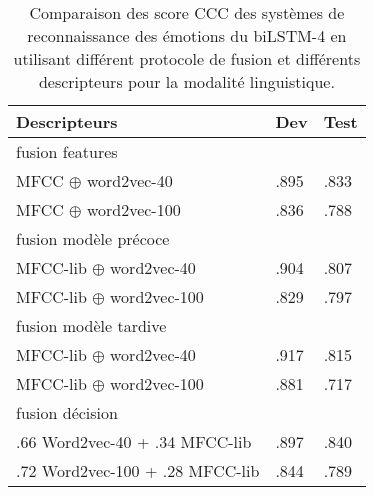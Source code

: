 \begin{table}[h]
  \centering
  \begin{tabular}{|l|l|l|}
  \hline
  Descripteurs   &Dev   &Test  \\
  \hline
  \multicolumn{3}{|l|}{fusion features} \\
  \hline
  MFCC $\oplus$ word2vec-40        &.895  & .833 \\
  MFCC $\oplus$ word2vec-100        &.836  & .788 \\
  \hline
  \multicolumn{3}{|l|}{fusion modèle précoce} \\
  \hline
  MFCC-lib $\oplus$ word2vec-40       & .904 & .807 \\
  MFCC-lib $\oplus$ word2vec-100       & .829 & .797 \\
  \hline
  \multicolumn{3}{|l|}{fusion modèle tardive}   \\
  \hline
  MFCC-lib $\oplus$ word2vec-40    & .917  & .815  \\
  MFCC-lib $\oplus$ word2vec-100    & .881  & .717  \\
  \hline
  \multicolumn{3}{|l|}{fusion décision} \\
  \hline
  .66 Word2vec-40 + .34 MFCC-lib     &.897  &.840  \\
  .72 Word2vec-100 + .28 MFCC-lib    &.844 & .789 \\
  \hline
\end{tabular}
\caption{Comparaison des score CCC des systèmes de reconnaissance des émotions du biLSTM-4 en utilisant différent protocole de fusion et différents descripteurs pour la modalité linguistique.}
\label{tab:res_fusion}
\end{table}
